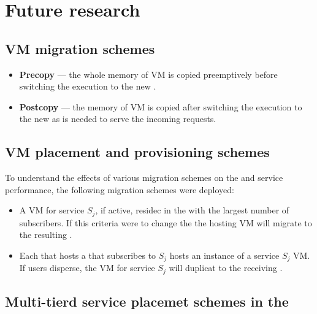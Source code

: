 \section{Future research}

\subsection{VM migration schemes}
\begin{itemize}
\item \textbf{Precopy} --- the whole memory of VM is copied preemptively before switching the execution to the new \dc{}.
\item \textbf{Postcopy} --- the memory of VM is copied after switching the execution to the new \dc{} as is needed to serve the incoming requests.
\end{itemize}

\subsection{VM placement and \dc{} provisioning schemes}
To understand the effects of various migration schemes on the \dc and service performance, the following migration schemes were deployed:

\begin{itemize}
\item A VM for service $S_j$, if active, residec in the \dc with the largest number of subscribers. If this criteria were to change the the hosting VM will migrate to the resulting \dc.
\item Each \dc that hosts a \ue that subscribes to $S_j$ hosts an instance of a service $S_j$ VM. If users disperse, the VM for service $S_j$ will duplicat to the receiving \dc.
\end{itemize}

\subsection{Multi-tierd service placemet schemes in the \xcloud{}}
